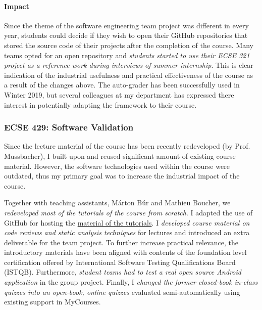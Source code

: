 \paragraph{Impact}
Since the theme of the software engineering team project was different in every year, students could decide if they wish to open their GitHub repositories that stored the source code of their projects after the completion of the course. Many teams opted for an open repository and \emph{students started to use their ECSE 321 project as a reference work during interviews of summer internship}. This is clear indication of the industrial usefulness and practical effectiveness of the course as a result of the changes above. 
The auto-grader has been successfully used in Winter 2019, but several colleagues at my department has expressed there interest in potentially adapting the framework to their course. 


\subsubsection{ECSE 429: Software Validation}


Since the lecture material of the course has been recently redeveloped (by Prof. Mussbacher), I built upon and reused significant amount of existing course material. However, the software technologies used within the course were outdated, thus my primary goal was to increase the industrial impact of the course. %

Together with teaching assistants, Márton Búr and Mathieu Boucher, we \emph{redeveloped most of the tutorials of the course from scratch}. I adapted the use of GitHub for hosting the \href{https://mcgill-ecse429-fall2018.github.io/Tutorial-Lecture-Notes/}{material of the tutorials}. I \emph{developed course material on code reviews and static analysis techniques} for lectures and introduced an extra deliverable for the team project. To further increase practical relevance, the introductory materials  have been aligned with contents of the foundation level certification offered by International Software Testing Qualifications Board (ISTQB). Furthermore, \emph{student teams had to test a real open source Android application} in the group project.  Finally, I \emph{changed the former closed-book in-class quizzes into an open-book, online quizzes} evaluated semi-automatically using existing support in MyCourses.

